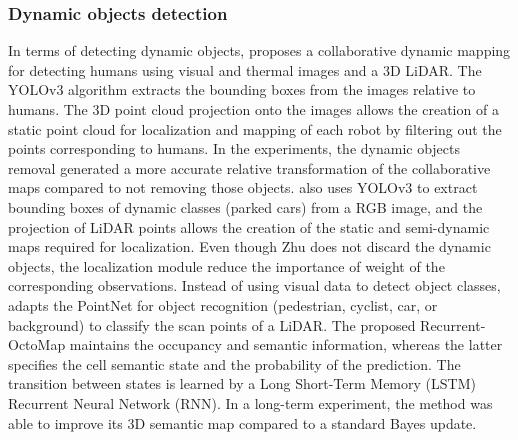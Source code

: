 \subsubsection{Dynamic objects detection}

In terms of detecting dynamic objects, \cite{yue-et-al:2020:9197072} proposes a collaborative dynamic mapping for detecting humans using visual and thermal images and a 3D LiDAR. The YOLOv3 algorithm extracts the bounding boxes from the images relative to humans. The 3D point cloud projection onto the images allows the creation of a static point cloud for localization and mapping of each robot by filtering out the points corresponding to humans. In the experiments, the dynamic objects removal generated a more accurate relative transformation of the collaborative maps compared to not removing those objects.
\cite{zhu-et-al:2021:9561584} also uses YOLOv3 to extract bounding boxes of dynamic classes (parked cars) from a RGB image, and the projection of LiDAR points allows the creation of the static and semi-dynamic maps required for localization. Even though Zhu does not discard the dynamic objects, the localization module reduce the importance of weight of the corresponding observations.
Instead of using visual data to detect object classes, \cite{sun-et-al:2018:2856268} adapts the PointNet for object recognition (pedestrian, cyclist, car, or background) to classify the scan points of a LiDAR. The proposed Recurrent-OctoMap maintains the occupancy and semantic information, whereas the latter specifies the cell semantic state and the probability of the prediction. The transition between states is learned by a Long Short-Term Memory (LSTM) Recurrent Neural Network (RNN). In a long-term experiment, the method was able to improve its 3D semantic map compared to a standard Bayes update.

